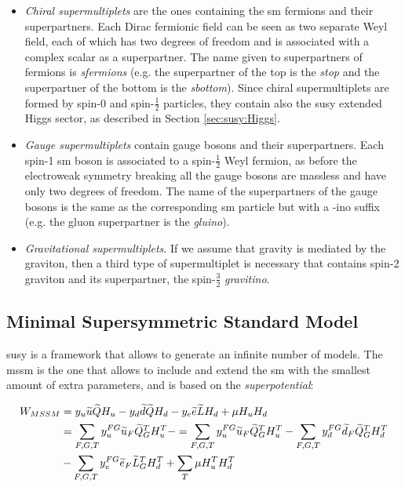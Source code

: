 \begin{itemize}
\item \textit{Chiral supermultiplets} are the ones containing the \gls{sm} fermions and their superpartners. Each Dirac fermionic field can be seen as two separate Weyl field, each of which has two degrees of freedom and is associated with a complex scalar as a superpartner. The name given to superpartners of fermions is \textit{sfermions} (e.g. the superpartner of the top is the \textit{stop} and the superpartner of the bottom is the \textit{sbottom}). Since chiral supermultiplets are formed by spin-0 and spin-$\frac{1}{2}$ particles, they contain also the \gls{susy} extended Higgs sector, as described in Section \ref{sec:susy:Higgs}.

\item \textit{Gauge supermultiplets} contain gauge bosons and their superpartners. Each spin-1 \gls{sm} boson is associated to a spin-$\frac{1}{2}$ Weyl fermion, as before the electroweak symmetry breaking all the gauge bosons are massless and have only two degrees of freedom. The name of the superpartners of the gauge bosons is the same as the corresponding \gls{sm} particle but with a -ino suffix (e.g. the gluon superpartner is the \textit{gluino}). 

\item \textit{Gravitational supermultiplets}. If we assume that gravity is mediated by the graviton, then a third type of supermultiplet is necessary that contains spin-2 graviton and its superpartner, the spin-$\frac{3}{2}$ \textit{gravitino}.

\end{itemize}




\subsection{Minimal Supersymmetric Standard Model}

\gls{susy} is a framework that allows to generate an infinite number of models. The \gls{mssm} is the one that allows to include and extend the \gls{sm} with the smallest amount of extra parameters, and is based on the \textit{superpotential}:

\begin{equation}
\begin{aligned}
W_{MSSM} & = y_u \widetilde{u} \widetilde{Q} H_u - y_d \widetilde{d}\widetilde{Q} H_d - y_e \widetilde{e} \widetilde{L}H_d + \mu H_u H_d \\  
& = \sum_{F, G, T} y_u^{FG} \widetilde{u}_F \widetilde{Q}_G^T H_u^T -
 = \sum_{F, G, T} y_u^{FG} \widetilde{u}_F \widetilde{Q}_G^T H_u^T - 
   \sum_{F, G, T} y_d^{FG} \widetilde{d}_F \widetilde{Q}_G^T H_d^T   \\ 
   & -
   \sum_{F, G, T} y_e^{FG} \widetilde{e}_F\widetilde{L}_G^T H_d^T  +
   \sum_{T} \mu H_u^T H_d^T \;
\end{aligned}
\label{eq:WMMS}
\end{equation}

